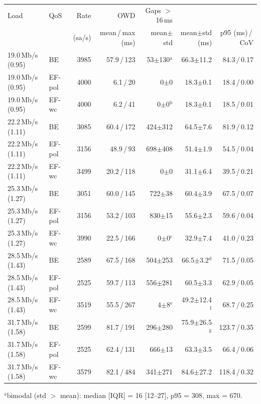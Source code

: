 \begin{tabular}{llrrrrr}
\toprule
Load & QoS & Rate & OWD & Gaps $>$16\,ms & \ttrip{} & \ttrip{} \\
 & & (sa/s) & mean\,/\,max (ms) & mean$\pm$std & mean$\pm$std (ms) & p95 (ms)\,/\,CoV \\
\midrule
19.0\,Mb/s (0.95) & BE & 3985 & 57.9\,/\,123 & 53$\pm$130$^{\mathrm{a}}$ & 66.3$\pm$11.2 & 84.3\,/\,0.17 \\
19.0\,Mb/s (0.95) & EF-pol & 4000 & 6.1\,/\,20 & 0$\pm$0 & 18.3$\pm$0.1 & 18.4\,/\,0.00 \\
19.0\,Mb/s (0.95) & EF-wc & 4000 & 6.2\,/\,41 & 0$\pm$0$^{\mathrm{b}}$ & 18.3$\pm$0.1 & 18.5\,/\,0.01 \\
22.2\,Mb/s (1.11) & BE & 3085 & 60.4\,/\,172 & 424$\pm$312 & 64.5$\pm$7.6 & 81.9\,/\,0.12 \\
22.2\,Mb/s (1.11) & EF-pol & 3156 & 48.9\,/\,93 & 698$\pm$408 & 51.4$\pm$1.9 & 54.5\,/\,0.04 \\
22.2\,Mb/s (1.11) & EF-wc & 3499 & 20.2\,/\,118 & 0$\pm$0 & 31.1$\pm$6.4 & 39.5\,/\,0.21 \\
25.3\,Mb/s (1.27) & BE & 3051 & 60.0\,/\,145 & 722$\pm$38 & 60.4$\pm$3.9 & 67.5\,/\,0.07 \\
25.3\,Mb/s (1.27) & EF-pol & 3156 & 53.2\,/\,103 & 830$\pm$15 & 55.6$\pm$2.3 & 59.6\,/\,0.04 \\
25.3\,Mb/s (1.27) & EF-wc & 3990 & 22.5\,/\,166 & 0$\pm$0$^{\mathrm{c}}$ & 32.9$\pm$7.4 & 41.0\,/\,0.23 \\
28.5\,Mb/s (1.43) & BE & 2589 & 67.5\,/\,168 & 504$\pm$253 & 66.5$\pm$3.2$^{\mathrm{d}}$ & 71.5\,/\,0.05 \\
28.5\,Mb/s (1.43) & EF-pol & 2525 & 59.7\,/\,113 & 556$\pm$281 & 60.5$\pm$3.3 & 62.9\,/\,0.05 \\
28.5\,Mb/s (1.43) & EF-wc & 3519 & 55.5\,/\,267 & 4$\pm$8$^{\mathrm{e}}$ & 49.2$\pm$12.4$^{\mathrm{f}}$ & 68.7\,/\,0.25 \\
31.7\,Mb/s (1.58) & BE & 2599 & 81.7\,/\,191 & 296$\pm$280 & 75.9$\pm$26.5$^{\mathrm{g}}$ & 123.7\,/\,0.35 \\
31.7\,Mb/s (1.58) & EF-pol & 2525 & 62.4\,/\,131 & 666$\pm$13 & 63.3$\pm$3.5 & 66.4\,/\,0.06 \\
31.7\,Mb/s (1.58) & EF-wc & 3579 & 82.1\,/\,484 & 341$\pm$271 & 84.6$\pm$27.2 & 118.4\,/\,0.32 \\
\bottomrule
\end{tabular}
\par\smallskip\footnotesize $^{\mathrm{a}}$bimodal (std $>$ mean): median [IQR] = 16 [12--27], p95 = 308, max = 670.
